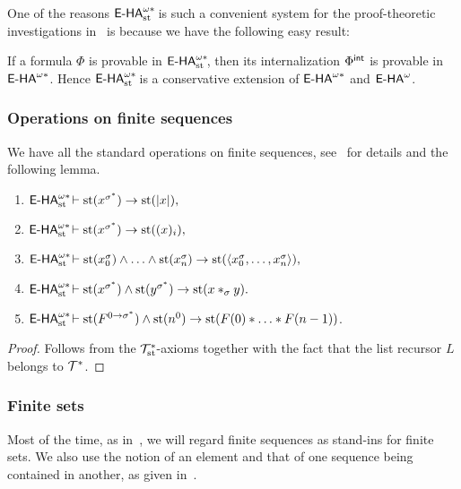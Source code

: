 One of the reasons ${\textsf{\upshape E-HA}}^{\omega*}_{\operatorname{st}{}}\!$ is such a convenient system for the proof-theoretic investigations in~\cite{BBS12} is because we have the following easy result:

\begin{prop} \label{conservativeint}
If a formula $\Phi$ is provable in ${\textsf{\upshape E-HA}}^{\omega*}_{\operatorname{st}{}}\!$, then its internalization $\Phi^{{\textsf{\upshape int}}}$ is provable in ${\textsf{\upshape E-HA}}^{\omega*}$. Hence ${\textsf{\upshape E-HA}}^{\omega*}_{\operatorname{st}{}}\!$ is a conservative extension of ${\textsf{\upshape E-HA}}^{\omega*}$ and ${\textsf{\upshape E-HA}}^\omega$.
\end{prop}

\subsubsection*{Operations on finite sequences}

We have all the standard operations on finite sequences, see~\cite{BBS12} for 
details and the following lemma.
\begin{lemma} \label{presstandardness}
     \begin{enumerate}
       \item ${\textsf{\upshape E-HA}}^{\omega*}_{\operatorname{st}{}}\! \vdash \operatorname{st}(x^{\sigma^*}) \to \operatorname{st} (|x|),$
      \item ${\textsf{\upshape E-HA}}^{\omega*}_{\operatorname{st}{}}\! \vdash \operatorname{st}(x^{\sigma^*}) \to \operatorname{st} ((x)_{i}),$
\item ${\textsf{\upshape E-HA}}^{\omega*}_{\operatorname{st}{}}\! \vdash \operatorname{st}(x^{\sigma}_0) \land \ldots \land \operatorname{st}(x^{\sigma}_n) \to \operatorname{st} (\langle x^{\sigma}_0,\ldots,x^{\sigma}_n\rangle),$
      \item ${\textsf{\upshape E-HA}}^{\omega*}_{\operatorname{st}{}}\! \vdash \operatorname{st}(x^{\sigma^*}) \land \operatorname{st}(y^{\sigma^*}) \to \operatorname{st} (x*_{\sigma}y).$
\item ${\textsf{\upshape E-HA}}^{\omega*}_{\operatorname{st}{}}\! \vdash \operatorname{st}(F^{0 \to \sigma^*}) \land \operatorname{st}(n^0) \to \operatorname{st}(F(0) * \ldots * F(n-1))$.
    \end{enumerate}
\end{lemma}
\begin{proof} Follows from the $\mathcal{T}^*_{\operatorname{st}{}}\!$-axioms together  with the fact that the list recursor $L$ belongs to $\mathcal{T}^*$.
\end{proof}

\subsubsection*{Finite sets}

Most of the time, as in~\cite{BBS12}, we will regard finite sequences as stand-ins for finite sets. We also use the notion of an element and that of one sequence being contained in another, as given in~\cite{BBS12}.

